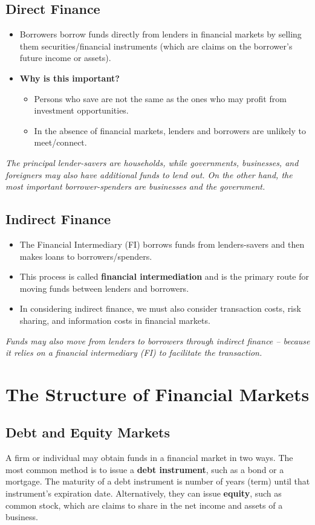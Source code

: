 \subsection{Direct Finance}
\begin{itemize}
    \item Borrowers borrow funds directly from lenders in financial markets by selling them securities/financial instruments (which are claims on the borrower’s future income or assets).
    \item \textbf{Why is this important?}
    \begin{itemize}
        \item Persons who save are not the same as the ones who may profit from investment opportunities.
        \item In the absence of financial markets, lenders and borrowers are unlikely to meet/connect.
    \end{itemize}
\end{itemize}
\textit{The principal lender-savers are households, while governments, businesses, and foreigners may also have additional funds to lend out. On the other hand, the most important borrower-spenders are businesses and the government.}

\subsection{Indirect Finance}
\begin{itemize}
    \item The Financial Intermediary (FI) borrows funds from lenders-savers and then makes loans to borrowers/spenders.
    \item This process is called \textbf{financial intermediation} and is the primary route for moving funds between lenders and borrowers.
    \item In considering indirect finance, we must also consider transaction costs, risk sharing, and information costs in financial markets.
\end{itemize}
\textit{Funds may also move from lenders to borrowers through indirect finance – because it relies on a financial intermediary (FI) to facilitate the transaction.}

\section{The Structure of Financial Markets}

\subsection{Debt and Equity Markets}
A firm or individual may obtain funds in a financial market in two ways. The most common method is to issue a \textbf{debt instrument}, such as a bond or a mortgage. The maturity of a debt instrument is number of years (term) until that instrument’s expiration date. Alternatively, they can issue \textbf{equity}, such as common stock, which are claims to share in the net income and assets of a business.

